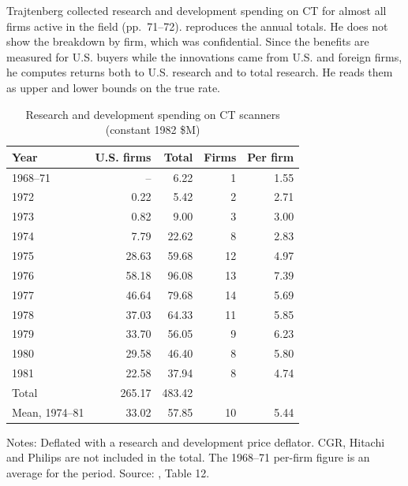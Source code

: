  Trajtenberg collected research and development
spending on CT for almost all firms active in the field (pp.~71--72).  reproduces the annual totals.
He does not show the breakdown by firm, which was confidential. Since the benefits are measured for U.S. buyers while
the innovations came from U.S. and foreign firms, he computes returns both to U.S. research and to total research. He
reads them as upper and lower bounds on the true rate.

\begin{table}[htbp]
\centering
\caption{Research and development spending on CT scanners (constant 1982 \$M)}
\label{tab:10-ct-rd}
\small
\begin{tabular}{@{}lrrrr@{}}
\toprule
Year & U.S. firms & Total & Firms & Per firm \\
\midrule
1968--71 & -- & 6.22 & 1 & 1.55 \\
1972 & 0.22 & 5.42 & 2 & 2.71 \\
1973 & 0.82 & 9.00 & 3 & 3.00 \\
1974 & 7.79 & 22.62 & 8 & 2.83 \\
1975 & 28.63 & 59.68 & 12 & 4.97 \\
1976 & 58.18 & 96.08 & 13 & 7.39 \\
1977 & 46.64 & 79.68 & 14 & 5.69 \\
1978 & 37.03 & 64.33 & 11 & 5.85 \\
1979 & 33.70 & 56.05 & 9 & 6.23 \\
1980 & 29.58 & 46.40 & 8 & 5.80 \\
1981 & 22.58 & 37.94 & 8 & 4.74 \\
\midrule
Total & 265.17 & 483.42 & & \\
Mean, 1974--81 & 33.02 & 57.85 & 10 & 5.44 \\
\bottomrule
\end{tabular}

\smallskip
\begin{minipage}{0.8\linewidth}
\footnotesize Notes: Deflated with a research and development price deflator. CGR, Hitachi and Philips
are not included in the total. The 1968--71 per-firm figure is an average for the period. Source:
\citet{Trajtenberg1985}, Table 12.
\end{minipage}
\end{table}

